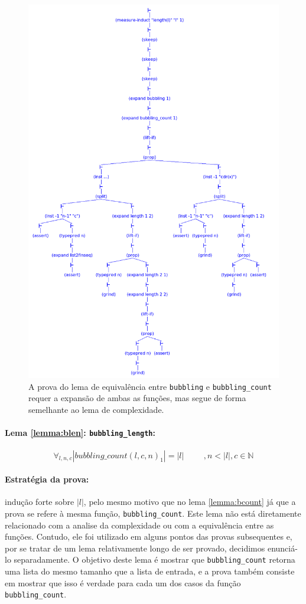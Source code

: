 \begin{figure}[H]
    \centering
    \includegraphics[width=0.\linewidth,trim={5cm 19cm 3cm 8cm},clip]{figures/bubbling-equiv.png}
    \caption{A prova do lema de equivalência entre \texttt{bubbling} e
    \texttt{bubbling\_count} requer a expansão de ambas as funções,
    mas segue de forma semelhante ao lema de complexidade.}
    \label{fig:bubbling4}
\end{figure}


\paragraph{Lema \ref{lemma:blen}: \texttt{bubbling\_length}:}
\begin{equation*}
    \forall_{l,n,c} |bubbling\_count(l, c, n)_1| = |l| \hspace{1cm}, n<|l|, c\in \mathbb{N}
\end{equation*}

\paragraph{Estratégia da prova:} indução forte sobre $|l|$, pelo mesmo motivo
que no lema \ref{lemma:bcount} já que a prova se refere à mesma função,
\texttt{bubbling\_count}. Este lema não está diretamente relacionado com
a analise da complexidade ou com a equivalência entre as funções. Contudo,
ele foi utilizado em alguns pontos das provas subsequentes e, por se tratar
de um lema relativamente longo de ser provado, decidimos enunciá-lo
separadamente. O objetivo deste lema é mostrar que \texttt{bubbling\_count}
retorna uma lista do mesmo tamanho que a lista de entrada, e a prova também
consiste em mostrar que isso é verdade para cada um dos casos da função
\texttt{bubbling\_count}.



